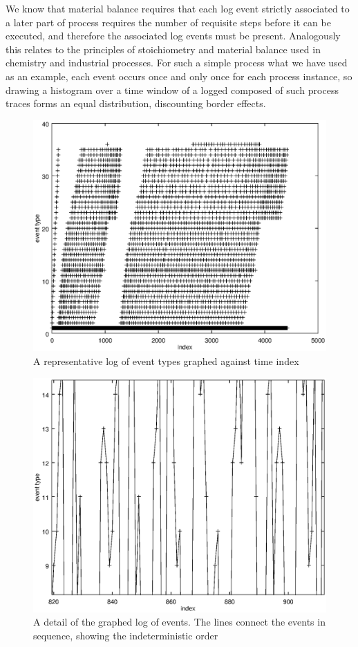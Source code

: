 \documentclass[journal]{IEEEtran}
\begin{document}
We know that material balance requires that each log event strictly associated to a later part of process requires the number of requisite steps before it can be executed, and
therefore the associated log events must be present. Analogously this relates to the principles of stoichiometry and material balance used in chemistry and industrial processes.
For such a simple process what we have used as an example, each event occurs once and only once for each process instance, so drawing a histogram over a time window of a logged
composed of such process traces forms an equal distribution, discounting border effects.

\begin{figure}[tb]
 \centering
 \includegraphics[width=8 cm,keepaspectratio=true]{./representative_log.eps}
 \caption{A representative log of event types graphed against time index}
 \label{figure:events}
\end{figure}

\begin{figure}[tb]
 \centering
 \includegraphics[width=8 cm,keepaspectratio=true]{./detail.eps}
 \caption{A detail of the graphed log of events. The lines connect the events in sequence, showing the indeterministic order}
 \label{figure:zoomed_events}
\end{figure}
\end{document}
